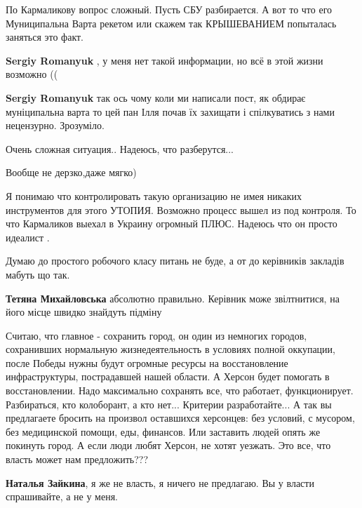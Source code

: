 \begin{itemize}

По Кармаликову вопрос сложный. Пусть СБУ разбирается. А вот то что его
Муниципальна Варта рекетом или скажем так КРЫШЕВАНИЕМ попыталась заняться это
факт.

\begin{itemize} %
\textbf{Sergiy Romanyuk} , у меня нет такой информации, но всё в этой жизни возможно ((

\textbf{Sergiy Romanyuk} так ось чому коли ми написали пост, як обдирає муніципальна варта то цей пан Ілля почав їх захищати і спілкуватись з нами нецензурно. Зрозуміло.
\end{itemize} %

Очень сложная ситуация.. Надеюсь, что разберутся...

Вообще не дерзко,даже мягко)


Я понимаю что контролировать такую организацию не имея никаких инструментов для
этого УТОПИЯ. Возможно процесс вышел из под контроля. То что Кармаликов выехал
в Украину огромный ПЛЮС. Надеюсь что он просто идеалист .

Думаю до простого робочого класу питань не буде, а от до керівників закладів мабуть що так.

\textbf{Тетяна Михайловська} абсолютно правильно. Керівник може звілтнитися, на його місце швидко знайдуть підміну


Считаю, что главное - сохранить город, он один из немногих городов, сохранивших
нормальную жизнедеятельность в условиях полной оккупации, после Победы нужны
будут огромные ресурсы на восстановление инфраструктуры, пострадавшей нашей
области. А Херсон будет помогать в восстановлении. Надо максимально сохранять
все, что работает, функционирует. Разбираться, кто колоборант, а кто нет... Критерии
разработайте... А так вы предлагаете бросить на произвол оставшихся
херсонцев: без условий, с мусором, без медицинской помощи, еды, финансов. Или
заставить людей опять же покинуть город. А если люди любят Херсон, не хотят
уезжать. Это все, что власть может нам предложить???

\begin{itemize} %
\textbf{Наталья Зайкина}, я же не власть, я ничего не предлагаю. Вы у власти спрашивайте, а не у меня.


\end{itemize}
\end{itemize}
